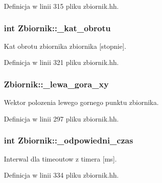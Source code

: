 Definicja w linii 315 pliku zbiornik.\+hh.

\hypertarget{class_zbiornik_a0ec6f5babd42c79bf3f1e7055e8d413e}{}
\subsubsection[{\+\_\+kat\+\_\+obrotu}]{\setlength{\rightskip}{0pt plus 5cm}int Zbiornik\+::\+\_\+kat\+\_\+obrotu\hspace{0.3cm}{\ttfamily [private]}}\label{class_zbiornik_a0ec6f5babd42c79bf3f1e7055e8d413e}
Kat obrotu zbiornika zbiornika \mbox{[}stopnie\mbox{]}. 

Definicja w linii 321 pliku zbiornik.\+hh.

\hypertarget{class_zbiornik_aab83049b3afbd20e1f158daf16e17e87}{}
\subsubsection[{\+\_\+lewa\+\_\+gora\+\_\+xy}]{ Zbiornik\+::\+\_\+lewa\+\_\+gora\+\_\+xy\hspace{0.3cm}{\ttfamily [private]}}\label{class_zbiornik_aab83049b3afbd20e1f158daf16e17e87}
Wektor polozenia lewego gornego punktu zbiornika. 

Definicja w linii 297 pliku zbiornik.\+hh.

\hypertarget{class_zbiornik_a14cf0ec861fc38fe40081342ef1e00df}{}
\subsubsection[{\+\_\+odpowiedni\+\_\+czas}]{\setlength{\rightskip}{0pt plus 5cm}int Zbiornik\+::\+\_\+odpowiedni\+\_\+czas\hspace{0.3cm}{\ttfamily [private]}}\label{class_zbiornik_a14cf0ec861fc38fe40081342ef1e00df}
Interwal dla timeout\textquotesingle{}ow z timera \mbox{[}ms\mbox{]}. 

Definicja w linii 334 pliku zbiornik.\+hh.

\hypertarget{class_zbiornik_aff57d3fb370566986df4eb58711cbfae}{}
